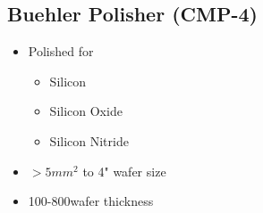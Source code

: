 \subsection{Buehler Polisher (CMP-4)}\label{cmp_machine_semi_clean}
\WaferSemiClean

\begin{itemize}
	\item Polished for
	\begin{itemize}
		\item Silicon
		\item Silicon Oxide 
		\item Silicon Nitride
	\end{itemize}
	\item $>5mm^2$ to 4" wafer size
	\item 100-800\um wafer thickness
\end{itemize}